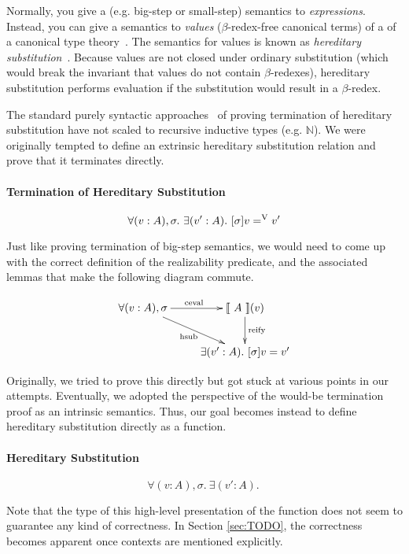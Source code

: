 \documentclass[preprint,nonatbib]{sigplanconf}
\numberwithin{subdefin}{defin}
\numberwithin{subtheorem}{theorem}
\newcommand{\refsec}[1]{Section \ref{sec:#1}}
\def\nat{\mathbb{N}}
\newcommand{\hsub}[2]{[\sigma]#1=^\con{V}#2}
\newcommand{\ascribe}[2]{(#1 : #2)}
\newcommand{\all}[1]{\forall#1.~}
\newcommand{\ex}[1]{\exists#1.~}
\newcommand{\el}[1]{\llbracket ~ #1 ~ \rrbracket}
\newcommand{\con}[1]{\textmd{#1}}
\newcommand{\fun}[1]{\textmd{#1}}
\begin{document}
Normally, you give a (e.g. big-step or small-step) semantics to
{\it expressions}. Instead, you can give a semantics to {\it values}
($\beta$-redex-free canonical terms) of a 
of a canonical type theory~\cite{TODO}. The semantics for values is
known as {\it hereditary substitution}~\cite{TODO}. Because values are
not closed under ordinary substitution (which would break the invariant that values
do not contain $\beta$-redexes), hereditary substitution
performs evaluation if the substitution would
result in a $\beta$-redex.

The standard purely syntactic approaches~\cite{TODO} of proving termination of
hereditary substitution have not scaled to recursive inductive types
(e.g. $\nat$). We were originally tempted to define an extrinsic
hereditary substitution relation and prove that it terminates directly.

\paragraph{Termination of Hereditary Substitution}

$$
\all{\ascribe{v}{A}, \sigma} \ex{\ascribe{v'}{A}} \hsub{v}{v'}
$$

Just like proving termination of big-step semantics, we would need to
come up with the correct definition of the realizability predicate,
and the associated lemmas that make the following diagram commute.

\begin{displaymath}
    \xymatrix{
          {\forall (v : A), \sigma} 
          \ar[dr]_{\fun{hsub}}
          \ar[r]^{\fun{ceval}}
        & {\el{A}(v)}
          \ar[d]^{\large{\fun{reify}}}
\\      & {\exists (v' : A). ~ [ \sigma ] v = v'} }
\end{displaymath}

Originally, we tried to prove this directly but got stuck at various
points in our attempts. Eventually, we adopted the perspective of the
would-be termination proof as an intrinsic semantics. Thus, our goal
becomes instead to define hereditary substitution directly as a
function.

\paragraph{Hereditary Substitution}
$$
\all{\ascribe{v}{A}, \sigma} \ex{\ascribe{v'}{A}}
$$

Note that the type of this high-level presentation of the function does
not seem to guarantee any kind of correctness. In \refsec{TODO}, the
correctness becomes apparent once contexts are mentioned explicitly.
\end{document}
